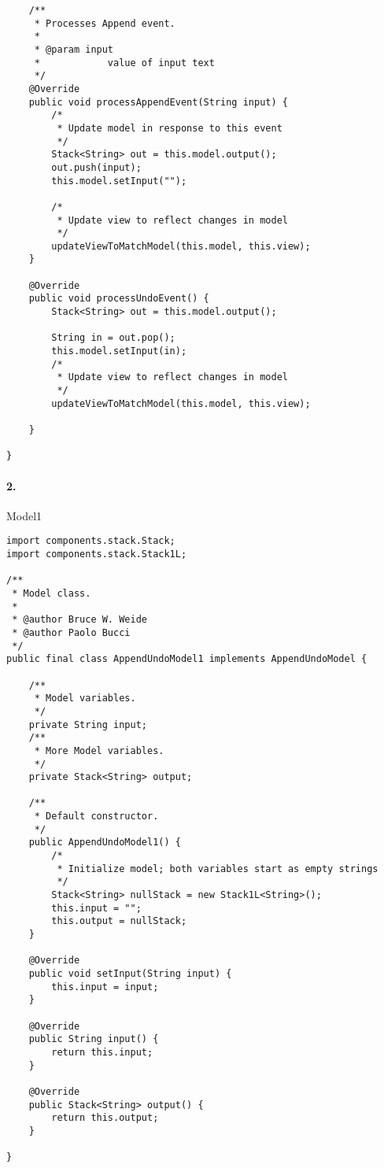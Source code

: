 \documentclass[10pt]{article}
\begin{document}
\begin{lstlisting}
    /**
     * Processes Append event.
     *
     * @param input
     *            value of input text
     */
    @Override
    public void processAppendEvent(String input) {
        /*
         * Update model in response to this event
         */
        Stack<String> out = this.model.output();
        out.push(input);
        this.model.setInput("");

        /*
         * Update view to reflect changes in model
         */
        updateViewToMatchModel(this.model, this.view);
    }

    @Override
    public void processUndoEvent() {
        Stack<String> out = this.model.output();

        String in = out.pop();
        this.model.setInput(in);
        /*
         * Update view to reflect changes in model
         */
        updateViewToMatchModel(this.model, this.view);

    }

}

\end{lstlisting}

\paragraph{2. } Model1

\begin{lstlisting}
import components.stack.Stack;
import components.stack.Stack1L;

/**
 * Model class.
 *
 * @author Bruce W. Weide
 * @author Paolo Bucci
 */
public final class AppendUndoModel1 implements AppendUndoModel {

    /**
     * Model variables.
     */
    private String input;
    /**
     * More Model variables.
     */
    private Stack<String> output;

    /**
     * Default constructor.
     */
    public AppendUndoModel1() {
        /*
         * Initialize model; both variables start as empty strings
         */
        Stack<String> nullStack = new Stack1L<String>();
        this.input = "";
        this.output = nullStack;
    }

    @Override
    public void setInput(String input) {
        this.input = input;
    }

    @Override
    public String input() {
        return this.input;
    }

    @Override
    public Stack<String> output() {
        return this.output;
    }

}

\end{lstlisting}
\end{document}
